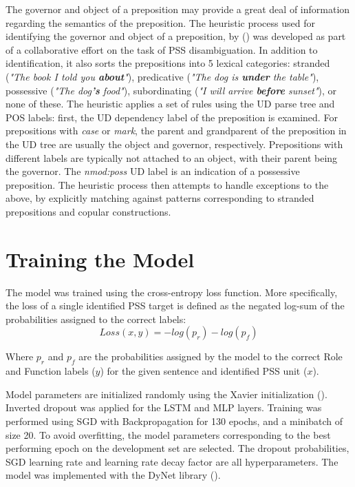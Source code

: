 The governor and object of a preposition may provide a great deal of information regarding the semantics of the preposition. The heuristic process used for identifying the governor and object of a preposition, by (\cite{snacs}) was developed as part of a collaborative effort on the task of PSS disambiguation. In addition to identification, it also sorts the prepositions into 5 lexical categories: stranded (\emph{"The book I told you \textbf{about}"}), predicative (\emph{"The dog is \textbf{under} the table"}), possessive (\emph{"The dog\textbf{'s} food"}), subordinating (\emph{"I will arrive \textbf{before} sunset"}), or none of these. The heuristic applies a set of rules using the UD parse tree and POS labels: first, the UD dependency label of the preposition is examined. For prepositions with \emph{case} or \emph{mark}, the parent and grandparent of the preposition in the UD tree are usually the object and governor, respectively. Prepositions with different labels are typically not attached to an object, with their parent being the governor.  The \emph{nmod:poss} UD label is an indication of a possessive preposition. The heuristic process then attempts to handle exceptions to the above, by explicitly matching against patterns corresponding to stranded prepositions and copular constructions.  

\section{Training the Model} \label{sec:psstraining}

The model was trained using the cross-entropy loss function. More specifically, the loss of a single identified PSS target is defined as the negated log-sum of the probabilities assigned to the correct labels: 
$$ Loss(x, y) = - log(p_r) - log(p_f) $$

Where $p_r$ and $p_f$ are the probabilities assigned by the model to the correct Role and Function labels ($y$) for the given sentence and identified PSS unit ($x$).

Model parameters are initialized randomly using the Xavier initialization (\cite{glorot10xavier}). Inverted dropout was applied for the LSTM and MLP layers. Training was performed using SGD with Backpropagation for 130 epochs, and a minibatch of size 20. To avoid overfitting, the model parameters corresponding to the best performing epoch on the development set are selected. The dropout probabilities, SGD learning rate and learning rate decay factor are all hyperparameters. The model was implemented with the DyNet library (\cite{dynet}).

